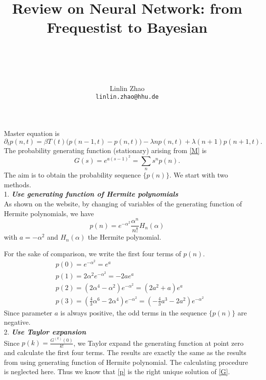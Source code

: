 \documentclass[paper=a4, fontsize=12pt]{scrartcl}	%
\title{ \vspace{-1in} 	\usefont{OT1}{bch}{b}{n}
		\huge \strut Review on Neural Network: from Frequestist to Bayesian \strut \\
		\Large \bfseries \strut \strut
}
\author{ 									\usefont{OT1}{bch}{m}{n}
        Linlin Zhao\\		\usefont{OT1}{bch}{m}{n}
        \texttt{linlin.zhao@hhu.de}
}
\date{}
\begin{document}

Master equation is
\begin{equation}
\partial_t p(n, t)=\beta T(t)\big(p(n-1, t)-p(n, t)\big)-\lambda np(n, t) + \lambda (n+1)p(n+1, t)\label{M}.
\end{equation}
The probability generating function (stationary) arising from \eqref{M} is
\begin{equation}
G(s)=e^{a(s-1)^2}=\sum_n s^np(n)\label{G}. 
\end{equation}
The aim is to obtain the probability sequence $\{ p(n)\}$. We start with two methods.
\\

1. {\bf{\it Use generating function of Hermite polynomials}}
\\

As shown on the website, by changing of variables of the generating function of Hermite polynomials, we have 
\begin{equation}
p(n) = e^{-\alpha^2} \frac{\alpha^n}{n!} H_n(\alpha)\label{p}
\end{equation}
with $a=-\alpha^2$ and $H_n(\alpha)$ the Hermite polynomial.

For the sake of comparison, we write the first four terms of $p(n)$. 
\begin{align}
&p(0) = e^{-\alpha^2} = e^a\\
&p(1) = 2\alpha^2 e^{-\alpha^2}=-2ae^a\\
&p(2) = (2\alpha^4-\alpha^2) e^{-\alpha^2}=(2a^2+a)e^a\\
&p(3) = (\frac{4}{3}\alpha^6-2\alpha^4) e^{-\alpha^2}=(-\frac{4}{3}a^3-2a^2) e^{-\alpha^2}
\end{align}
Since parameter $a$ is always positive, the odd terms in the sequence $\{p(n)\}$ are negative. \\


2. {\bf{\it Use Taylor expansion}}
\\

Since $p(k)=\frac{G^{(k)}(0)}{k!}$, we Taylor expand the generating function at point zero and calculate the first four terms. The results are exactly the same as the results from using generating function of Hermite polynomial. The calculating procedure is neglected here. Thus we know that \eqref{p} is the right unique solution of \eqref{G}.\\
\end{document}
